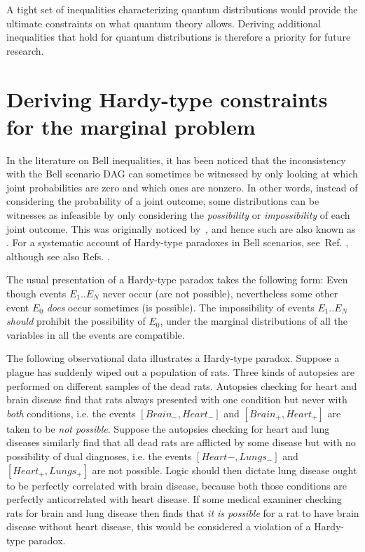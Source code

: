 
A tight set of inequalities characterizing quantum distributions would provide the ultimate constraints on what quantum theory allows. Deriving additional inequalities that hold for quantum distributions is therefore a priority for future research.

\section{Deriving Hardy-type constraints for the marginal problem}\label{sec:TSEM}

In the literature on Bell inequalities, it has been noticed that the inconsistency with the Bell scenario DAG can sometimes be witnessed by only looking at which joint probabilities are zero and which ones are nonzero. In other words, instead of considering the probability of a joint outcome, some distributions can be witnesses as infeasible by only considering the \emph{possibility} or \emph{impossibility} of each joint outcome. This was originally noticed by~\citet{L.Hardy:PRL:1665}, and hence such  are also known as . For a systematic account of Hardy-type paradoxes in Bell scenarios, see~Ref. \cite{Mansfield2012}, although see also Refs. \cite{Garuccio95,CabelloHardyInequality,Braun08,Mancinska14,LSW}.

The usual presentation of a Hardy-type paradox takes the following form: Even though events $E_1 .. E_N$ never occur (are not possible), nevertheless some other event $E_0$ \emph{does} occur sometimes (is possible). The impossibility of events $E_1 .. E_N$ \emph{should} prohibit the possibility of $E_0$, under the marginal distributions of all the variables in all the events are compatible.

The following observational data illustrates a Hardy-type paradox. Suppose a plague has suddenly wiped out a population of rats. Three kinds of autopsies are performed on different samples of the dead rats. Autopsies checking for heart and brain disease find that rats always presented with one condition but never with \emph{both} conditions, i.e. the events $[Brain_{-},Heart_{-}]$ and $[Brain_{+},Heart_{+}]$ are taken to be \emph{not possible}. Suppose the autopsies checking for heart and lung diseases similarly find that all dead rats are afflicted by some disease but with no possibility of dual diagnoses, i.e. the events $[Heart{-},Lungs_{-}]$ and $[Heart_{+},Lungs_{+}]$ are not possible. Logic should then dictate lung disease ought to be perfectly correlated with brain disease, because both those conditions are perfectly anticorrelated with heart disease. If some medical examiner checking rats for brain and lung disease then finds that \emph{it is possible} for a rat to have brain disease without heart disease, this would be considered a violation of a Hardy-type paradox.

